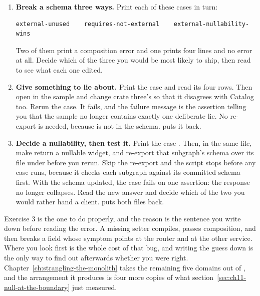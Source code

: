 \begin{enumerate}
  and put the two logs side by side. The second one has four lookups, which is
  the obvious difference. Find the other one, and then find the line in
   that causes it. If the script complains that
  a port is taken, an earlier run is still up.

  \item \textbf{Break a schema three ways.} Print each of these cases in turn:

  \begin{verbatim}
external-unused    requires-not-external    external-nullability-wins
  \end{verbatim}

  Two of them print a composition error and one prints four lines and no error
  at all. Decide which of the three you would be most likely to ship, then read
   to see what each one edited.

  \item \textbf{Give  something to lie about.} Print the case
   and read its four rows. Then open
   in the sample and change crate three's  so
  that it disagrees with Catalog too. Rerun the case. It fails, and the failure
  message is the assertion telling you that the sample no longer contains
  exactly one deliberate lie. No re-export is needed, because 
  is not in the schema.  puts it back.

  \item \textbf{Decide a nullability, then test it.} Print the case
  . Then, in the same file, make
   return a nullable widget, and re-export that subgraph's
  schema over its file under  before you rerun. Skip the
  re-export and the script stops before any case runs, because it checks each
  subgraph against its committed schema first. With the schema updated, the
  case fails on one assertion: the response no longer collapses. Read the new
  answer and decide which of the two you would rather hand a client.
   puts both files back.
\end{enumerate}

Exercise 3 is the one to do properly, and the reason is the sentence you write
down before reading the error. A missing setter compiles, passes composition,
and then breaks a field whose symptom points at the router and at the other
service. Where you look first is the whole cost of that bug, and writing the
guess down is the only way to find out afterwards whether you were right.
Chapter~\ref{ch:strangling-the-monolith} takes the remaining five domains out
of , and the arrangement it produces is four more copies of
what section~\ref{sec:ch11-null-at-the-boundary} just measured.
